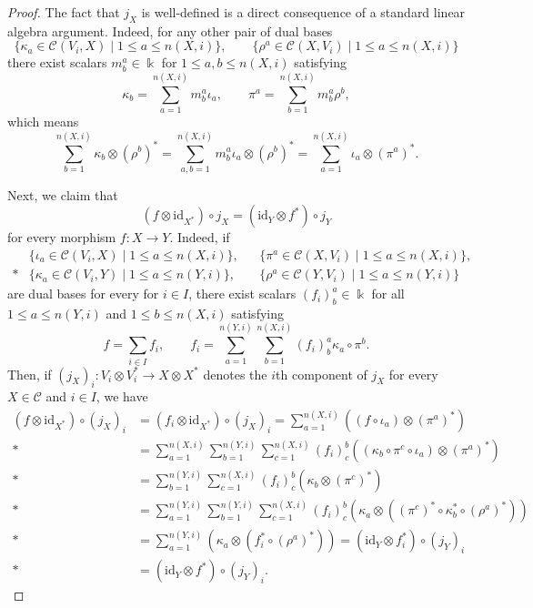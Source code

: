 \documentclass[a4paper,reqno]{amsart}
\theoremstyle{definition}
\theoremstyle{remark}
\newcommand{\calC}{\mathcal{C}}
\newcommand{\id}{\mathrm{id}}
\newcommand{\leqs}{\leqslant}
\begin{document}
\begin{proof}
 The fact that $j_X$ is well-defined is a direct consequence of a standard linear algebra argument. Indeed, for any other pair of dual bases
 \[
  \{ \kappa_a \in \calC(V_i,X) \mid 1 \leqs a \leqs n(X,i) \}, \qquad
  \{ \rho^a \in \calC(X,V_i) \mid 1 \leqs a \leqs n(X,i) \}
 \]
 there exist scalars $m^a_b \in \Bbbk$ for $1 \leqs a,b \leqs n(X,i)$ satisfying
 \[
  \kappa_b = \sum_{a=1}^{n(X,i)} m^a_b \iota_a, \qquad
  \pi^a = \sum_{b=1}^{n(X,i)} m^a_b \rho^b,
 \]
 which means
 \[
  \sum_{b=1}^{n(X,i)} \kappa_b \otimes (\rho^b)^* = \sum_{a,b=1}^{n(X,i)} m^a_b \iota_a \otimes (\rho^b)^* = \sum_{a=1}^{n(X,i)} \iota_a \otimes (\pi^a)^*.
 \]

 Next, we claim that
 \[
  (f \otimes \id_{X^*}) \circ j_X = (\id_Y \otimes f^*) \circ j_Y
 \]
 for every morphism $f : X \to Y$. Indeed, if
 \begin{align*}
  &\{ \iota_a \in \calC(V_i,X) \mid 1 \leqs a \leqs n(X,i) \}, &
  &\{ \pi^a \in \calC(X,V_i) \mid 1 \leqs a \leqs n(X,i) \}, \\*
  &\{ \kappa_a \in \calC(V_i,Y) \mid 1 \leqs a \leqs n(Y,i) \}, &
  &\{ \rho^a \in \calC(Y,V_i) \mid 1 \leqs a \leqs n(Y,i) \}
 \end{align*}
 are dual bases for every for $i \in I$, there exist scalars $(f_i)^a_b \in \Bbbk$ for all $1 \leqs a \leqs n(Y,i)$ and $1 \leqs b \leqs n(X,i)$ satisfying
 \[
  f = \sum_{i \in I} f_i, \qquad
  f_i = \sum_{a=1}^{n(Y,i)} \sum_{b=1}^{n(X,i)} (f_i)^a_b \kappa_a \circ \pi^b.
 \]
 Then, if $(j_X)_i : V_i \otimes V_i^* \to X \otimes X^*$ denotes the $i$th component of $j_X$ for every $X \in \calC$ and $i \in I$, we have
 \begin{align*}
  (f \otimes \id_{X^*}) \circ (j_X)_i 
  &= (f_i \otimes \id_{X^*}) \circ (j_X)_i 
  = \sum_{a=1}^{n(X,i)} \left( (f \circ \iota_a) \otimes (\pi^a)^* \right) \\*
  &= \sum_{a=1}^{n(X,i)} \sum_{b=1}^{n(Y,i)} \sum_{c=1}^{n(X,i)} (f_i)^b_c \left( (\kappa_b \circ \pi^c \circ \iota_a) \otimes (\pi^a)^* \right) \\*
  &= \sum_{b=1}^{n(Y,i)} \sum_{c=1}^{n(X,i)} (f_i)^b_c \left( \kappa_b \otimes (\pi^c)^* \right) \\*
  &= \sum_{a=1}^{n(Y,i)} \sum_{b=1}^{n(Y,i)} \sum_{c=1}^{n(X,i)} (f_i)^b_c \left( \kappa_a \otimes ((\pi^c)^* \circ \kappa_b^* \circ (\rho^a)^*) \right) \\*
  &= \sum_{a=1}^{n(Y,i)} \left( \kappa_a \otimes (f_i^* \circ (\rho^a)^*) \right) 
  = (\id_Y \otimes f_i^*) \circ (j_Y)_i \\*
  &= (\id_Y \otimes f^*) \circ (j_Y)_i.
 \end{align*}
 

\end{proof}
\end{document}
